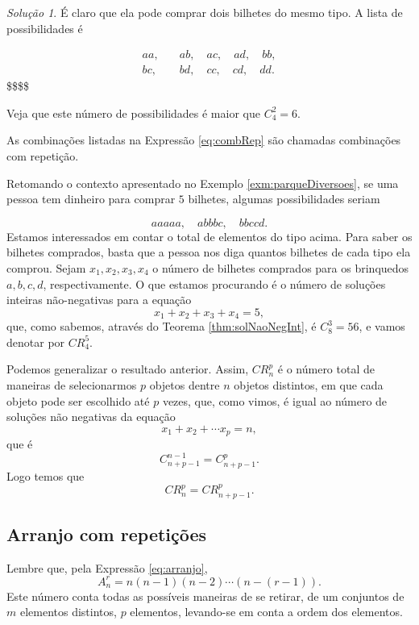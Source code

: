 \documentclass[]{book}
\theoremstyle{definition}
\theoremstyle{definition}
\theoremstyle{definition}
\theoremstyle{remark}
\newtheorem*{solution}{Solução}
\begin{document}
\begin{solution}
\iffalse{} {Solução. } \fi{}É claro que ela pode comprar dois bilhetes do mesmo tipo.
A lista de possibilidades é

\begin{align}
aa, &\quad ab, \quad ac, \quad ad, \quad bb, \\
bc, &\quad bd, \quad cc, \quad cd, \quad dd. 
\label{eq:combRep}
\end{align}
\$\$\$\$

Veja que este número de possibilidades é maior que \(C^2_4=6\).
\end{solution}

As combinações listadas na Expressão \eqref{eq:combRep} são chamadas combinações com repetição.

Retomando o contexto apresentado no Exemplo \ref{exm:parqueDiversoes}, se uma pessoa tem dinheiro para comprar \(5\) bilhetes, algumas possibilidades seriam

\[aaaaa, \quad abbbc, \quad bbccd.\]
Estamos interessados em contar o total de elementos do tipo acima.
Para saber os bilhetes comprados, basta que a pessoa nos diga quantos bilhetes de cada tipo ela comprou.
Sejam \(x_1, x_2, x_3, x_4\) o número de bilhetes comprados para os brinquedos \(a,b,c,d\), respectivamente.
O que estamos procurando é o número de soluções inteiras não-negativas para a equação
\[x_1+x_2+x_3+x_4=5,\]
que, como sabemos, através do Teorema \ref{thm:solNaoNegInt}, é \(C^3_8=56\), e vamos denotar por \(CR^5_4\).

Podemos generalizar o resultado anterior.
Assim, \(CR^p_n\) é o número total de maneiras de selecionarmos \(p\) objetos dentre \(n\) objetos distintos, em que cada objeto pode ser escolhido até \(p\) vezes, que, como vimos, é igual ao número de soluções não negativas da equação
\[x_1+x_2+\cdots x_p=n,\]
que é \[C^{n-1}_{n+p-1}=C^{p}_{n+p-1}.\]
Logo temos que
\[CR^{p}_{n}=CR^{p}_{n+p-1}.\]

\hypertarget{arranjo-com-repetiuxe7uxf5es}{%
\subsection{Arranjo com repetições}\label{arranjo-com-repetiuxe7uxf5es}}

Lembre que, pela Expressão \eqref{eq:arranjo},
\[A^{r}_{n} = n(n-1)(n-2)\cdots(n-(r-1)).\]
Este número conta todas as possíveis maneiras de se retirar, de um conjuntos de \(m\) elementos distintos, \(p\) elementos, levando-se em conta a ordem dos elementos.
\end{document}
